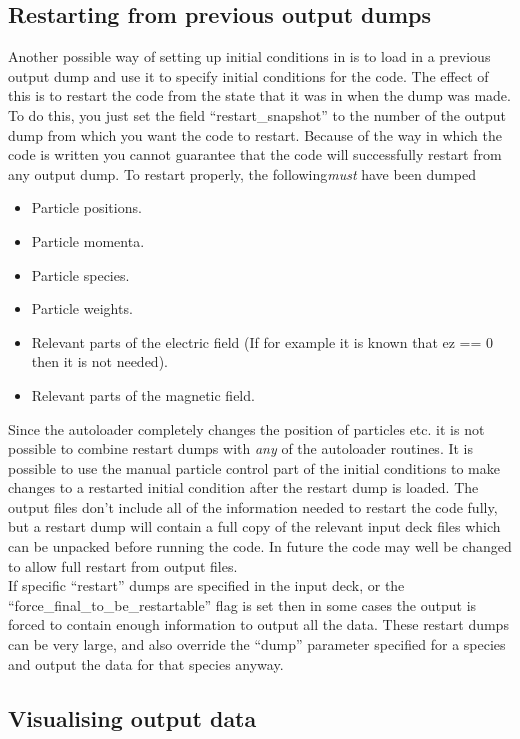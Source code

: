 \documentclass[12pt,a4paper]{article}
\newcommand{\EPOCH}{{\color{warwickdark}\fontfamily{phv}\selectfont{EPOCH}}}
\begin{document}
\subsection{Restarting {\EPOCH} from previous output dumps}
Another possible way of setting up initial conditions in {\EPOCH} is to load in
a previous output dump and use it to specify initial conditions for the
code. The effect of this is to restart the code from the state that it was in
when the dump was made. To do this, you just
set the field ``restart\_snapshot'' to
the number of the output dump from which you want the code to restart. Because
of the way in which the code is written you cannot guarantee that the code will
successfully restart from any output dump. To restart properly, the
following{\it must} have been dumped
\begin{itemize}
\item Particle positions.
\item Particle momenta.
\item Particle species.
\item Particle weights.
\item Relevant parts of the electric field (If for example it is known that
  ez == 0 then it is not needed).
\item Relevant parts of the magnetic field.
\end{itemize}
Since the autoloader completely changes the position of particles etc. it is
not possible to combine restart dumps with {\it any} of the autoloader
routines. It is possible to use the manual particle control part of the
initial conditions to make changes to a restarted initial condition after the
restart dump is loaded. The output files don't include all of the information
needed to restart the code fully, but a restart dump will contain a full copy
of the relevant input deck files which can be unpacked before running the
code. In future the code may well be changed to allow full restart from
output files.\\

If specific ``restart'' dumps are specified in the input deck, or the
``force\_final\_to\_be\_restartable'' flag is set then in some cases the
output is forced to contain enough information to output all the data. These
restart dumps can be very large, and also override the ``dump'' parameter
specified for a species and output the data for that species anyway.

\subsection{Visualising {\EPOCH} output data}
\end{document}

